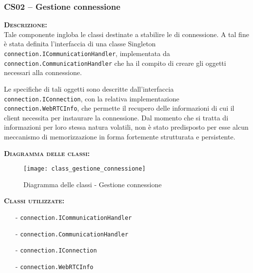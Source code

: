 \subsubsection{CS02 -- Gestione connessione}
\begin{description}
	\item{\scshape\bfseries Descrizione:}\\
Tale componente ingloba le classi destinate a stabilire le  di connessione. A tal fine è stata definita l'interfaccia di una classe Singleton \texttt{connection.ICommunicationHandler}, implementata da \texttt{connection.CommunicationHandler} che ha il compito di creare gli oggetti necessari alla connessione.

Le specifiche di tali oggetti sono descritte dall'interfaccia \texttt{connection.IConnection}, con la relativa implementazione \texttt{connection.WebRTCInfo}, che permette il recupero delle informazioni di cui il client necessita per instaurare la connessione. Dal momento che si tratta di informazioni per loro stessa natura volatili, non è stato predisposto per esse alcun meccanismo di memorizzazione in forma fortemente strutturata e persistente.
	\item{\scshape\bfseries Diagramma delle classi:}
	\begin{figure}[H]
\begin{center}
\texttt{[image: class\_gestione\_connessione]}
\caption{Diagramma delle classi - Gestione connessione}\label{fig:gestione_connessione}
\end{center}
\end{figure}
	
	\item{\scshape\bfseries Classi utilizzate:}
	\begin{itemize}[nolistsep, noitemsep]
	  \item[-] \texttt{connection.ICommunicationHandler}
	  \item[-] \texttt{connection.CommunicationHandler}
	  \item[-] \texttt{connection.IConnection}
	  \item[-] \texttt{connection.WebRTCInfo}
	\end{itemize}
\end{description}

